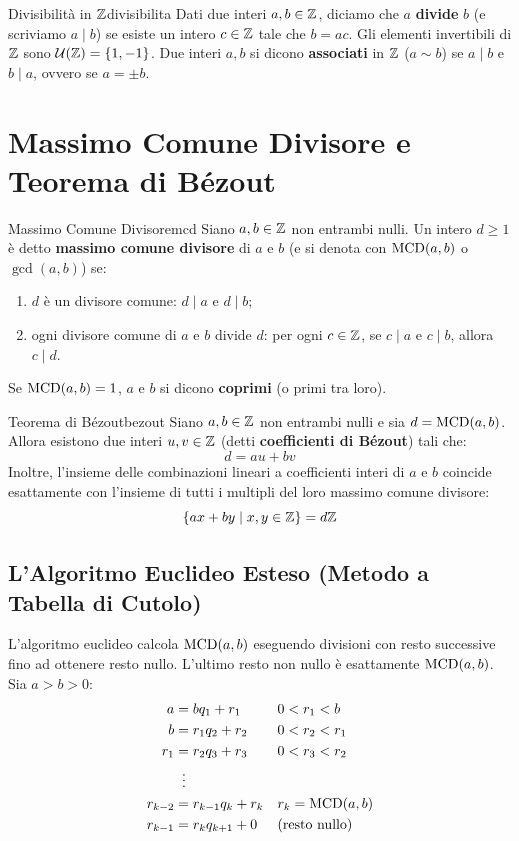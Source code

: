 \begin{definizione}{Divisibilità in $\mathbb{Z}$}{divisibilita}
Dati due interi $a, b \in \mathbb{Z}$, diciamo che $a$ \textbf{divide} $b$ (e scriviamo $a \mid b$) se esiste un intero $c \in \mathbb{Z}$ tale che $b = ac$.
Gli elementi invertibili di $\mathbb{Z}$ sono $\mathcal{U}(\mathbb{Z}) = \{1, -1\}$.
Due interi $a, b$ si dicono \textbf{associati} in $\mathbb{Z}$ ($a \sim b$) se $a \mid b$ e $b \mid a$, ovvero se $a = \pm b$.
\end{definizione}

\section{Massimo Comune Divisore e Teorema di Bézout}

\begin{definizione}{Massimo Comune Divisore}{mcd}
Siano $a, b \in \mathbb{Z}$ non entrambi nulli. Un intero $d \ge 1$ è detto \textbf{massimo comune divisore} di $a$ e $b$ (e si denota con $\operatorname{MCD}(a, b)$ o $\gcd(a, b)$) se:
\begin{enumerate}
    \item $d$ è un divisore comune: $d \mid a$ e $d \mid b$;
    \item ogni divisore comune di $a$ e $b$ divide $d$: per ogni $c \in \mathbb{Z}$, se $c \mid a$ e $c \mid b$, allora $c \mid d$.
\end{enumerate}
Se $\operatorname{MCD}(a, b) = 1$, $a$ e $b$ si dicono \textbf{coprimi} (o primi tra loro).
\end{definizione}

\begin{teorema}{Teorema di Bézout}{bezout}
Siano $a, b \in \mathbb{Z}$ non entrambi nulli e sia $d = \operatorname{MCD}(a, b)$. Allora esistono due interi $u, v \in \mathbb{Z}$ (detti \textbf{coefficienti di Bézout}) tali che:
\[
    d = au + bv
\]
Inoltre, l'insieme delle combinazioni lineari a coefficienti interi di $a$ e $b$ coincide esattamente con l'insieme di tutti i multipli del loro massimo comune divisore:
\[
    \{ax + by \mid x, y \in \mathbb{Z}\} = d\mathbb{Z}
\]
\end{teorema}

\subsection{L'Algoritmo Euclideo Esteso (Metodo a Tabella di Cutolo)}
L'algoritmo euclideo calcola $\operatorname{MCD}(a, b)$ eseguendo divisioni con resto successive fino ad ottenere resto nullo. L'ultimo resto non nullo è esattamente $\operatorname{MCD}(a, b)$.
Sia $a > b > 0$:
\begin{align*}
    a &= b q_1 + r_1 && 0 < r_1 < b \\
    b &= r_1 q_2 + r_2 && 0 < r_2 < r_1 \\
    r_1 &= r_2 q_3 + r_3 && 0 < r_3 < r_2 \\
    &\;\;\vdots && \\
    r_{k-2} &= r_{k-1} q_k + r_k && r_k = \operatorname{MCD}(a, b) \\
    r_{k-1} &= r_k q_{k+1} + 0 && (\text{resto nullo})
\end{align*}

